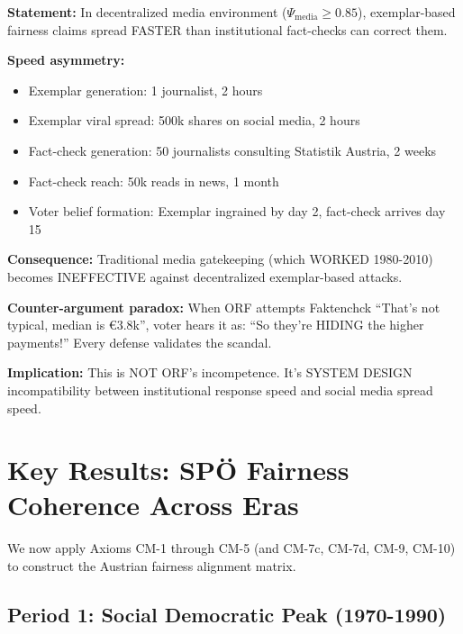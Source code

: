 \vspace{0.5em}

\begin{tcolorbox}[colback=gray!5!white, colframe=gray!75!black,
    title=Axiom CM-10: Institutional Lag and Media Gatekeeping Collapse]

\textbf{Statement:} In decentralized media environment ($\Psi_{\text{media}} \geq 0.85$),
exemplar-based fairness claims spread FASTER than institutional fact-checks can correct them.

\textbf{Speed asymmetry:}
\begin{itemize}[nosep]
\item Exemplar generation: 1 journalist, 2 hours
\item Exemplar viral spread: 500k shares on social media, 2 hours
\item Fact-check generation: 50 journalists consulting Statistik Austria, 2 weeks
\item Fact-check reach: 50k reads in news, 1 month
\item Voter belief formation: Exemplar ingrained by day 2, fact-check arrives day 15
\end{itemize}

\textbf{Consequence:} Traditional media gatekeeping (which WORKED 1980-2010) becomes
INEFFECTIVE against decentralized exemplar-based attacks.

\textbf{Counter-argument paradox:} When ORF attempts Faktenchck ``That's not typical,
median is €3.8k'', voter hears it as: ``So they're HIDING the higher payments!''
Every defense validates the scandal.

\textbf{Implication:} This is NOT ORF's incompetence. It's SYSTEM DESIGN incompatibility
between institutional response speed and social media spread speed.

\end{tcolorbox}

\section{Key Results: SPÖ Fairness Coherence Across Eras}
\label{sec:cm-results}

We now apply Axioms CM-1 through CM-5 (and CM-7c, CM-7d, CM-9, CM-10) to construct the Austrian fairness alignment matrix.

\subsection{Period 1: Social Democratic Peak (1970-1990)}

